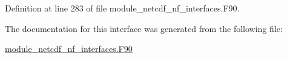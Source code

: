 Definition at line 283 of file module\+\_\+netcdf\+\_\+nf\+\_\+interfaces.\+F90.



The documentation for this interface was generated from the following file\+:\begin{DoxyCompactItemize}
\item 
\hyperlink{module__netcdf__nf__interfaces_8F90}{module\+\_\+netcdf\+\_\+nf\+\_\+interfaces.\+F90}\end{DoxyCompactItemize}

